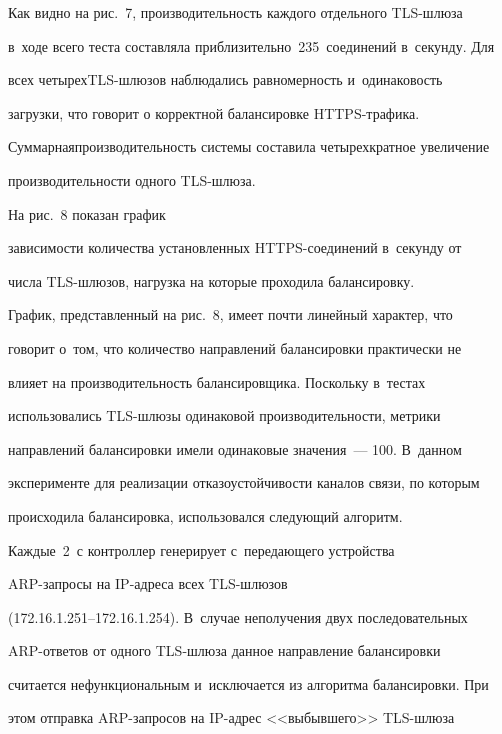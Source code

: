   


  Как видно на рис.~7, производительность каждого отдельного TLS-шлю\-за 


в~ходе всего теста со\-став\-ля\-ла приблизительно~235~соединений в~секунду. Для 


всех четырех\linebreak TLS-шлю\-зов наблюдались равномерность и~одинаковость 


загрузки, что говорит о корректной балансировке HTTPS-тра\-фи\-ка. 


Суммар\-ная\linebreak производительность системы со\-ста\-ви\-ла четырехкратное увеличение 


производительности одного TLS-шлю\-за. 





На рис.~8 показан график 


зависимости количества установленных HTTPS-со\-еди\-не\-ний в~секунду от 


чис\-ла TLS-шлю\-зов, нагрузка на которые проходила балансировку.


      График, представленный на рис.~8, имеет почти линейный характер, что 


говорит о~том, что количество на\-прав\-ле\-ний балансировки практически не 


влияет на производительность балансировщика. Поскольку в~тестах 


использовались TLS-шлю\-зы одинаковой производительности, метрики 


на\-прав\-ле\-ний балансировки имели одинаковые значения~--- 100. В~данном 


эксперименте для реализации от\-ка\-зо\-устой\-чи\-вости каналов связи, по которым 


происходила балансировка, использовался сле\-ду\-ющий алгоритм. 


Каждые~2~с контроллер генерирует с~пе\-ре\-да\-юще\-го устройства  


ARP-за\-про\-сы на IP-ад\-ре\-са всех TLS-шлю\-зов  


(172.16.1.251--172.16.1.254). В~случае неполучения двух последовательных 


ARP-от\-ве\-тов от одного TLS-шлю\-за данное направление балансировки 


считается нефункциональным и~исключается из алгоритма балансировки. При 


этом отправка ARP-запросов на IP-ад\-рес <<выбывшего>> TLS-шлю\-за 


